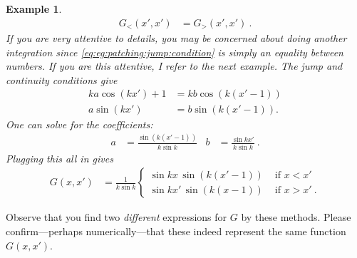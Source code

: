 \documentclass[
  11pt,
	colorful,
	raggedright,
]{tufte-style-thesis-flip}
\newtheorem{example}{Example}[section]
\begin{document}
\begin{example}
\begin{align}
  G_<(x',x') &= G_>(x',x') \ .
\end{align}
If you are very attentive to details, you may be concerned about doing another integration since \eqref{eq:eg:patching:jump:condition} is simply an equality between numbers. If you are this attentive, I refer to the next example.
The jump and continuity conditions give
\begin{align}
  ka \cos(kx') + 1 &= kb \cos \left(k(x'-1)\right)
  \\
  a\sin(kx') &= b\sin \left(k(x'-1)\right) .
\end{align}
One can solve for the coefficients:
\begin{align}
  a&= \frac{\sin \left(k(x'-1)\right)}{k\sin k}
  &
  b&= \frac{\sin kx'}{k\sin k} \ .
\end{align}
Plugging this all in gives 
\begin{align}
  G(x,x') &=
  \frac{1}{k\sin k}
  \begin{cases}
  \sin kx \, \sin \left(k(x'-1)\right) &\text{ if }x < x'
  \\
  \sin kx' \, \sin \left(k(x-1)\right) &\text{ if }x > x' \ .
  \end{cases}
\end{align}
\end{example}
Observe that you find two \emph{different} expressions for $G$ by these methods. Please confirm---perhaps numerically---that these indeed represent the same function $G(x,x')$. 
\end{document}
